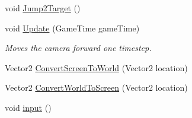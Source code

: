 \begin{DoxyCompactItemize}
\item 
void \hyperlink{classgearit_1_1xna_1_1_camera2_d_a2760ade6a85e08acb42fce0195facd9a}{Jump2\+Target} ()
\item 
void \hyperlink{classgearit_1_1xna_1_1_camera2_d_af79516e32acea49716efaad1bb6adf6a}{Update} (Game\+Time game\+Time)
\begin{DoxyCompactList}\small\item\em Moves the camera forward one timestep. \end{DoxyCompactList}\item 
Vector2 \hyperlink{classgearit_1_1xna_1_1_camera2_d_a85eba6fc6a61bbb6e841edb2c7f50cbe}{Convert\+Screen\+To\+World} (Vector2 location)
\item 
Vector2 \hyperlink{classgearit_1_1xna_1_1_camera2_d_a7bc6005e36d393927b04aa2d56bf4e95}{Convert\+World\+To\+Screen} (Vector2 location)
\item 
void \hyperlink{classgearit_1_1xna_1_1_camera2_d_a18fa7963b374103fdfaab1607d46d884}{input} ()
\end{DoxyCompactItemize}
